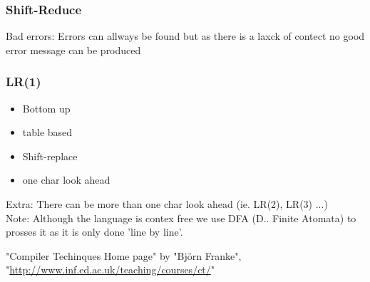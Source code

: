 \documentclass[11pt,twoside,a4paper]{article}
\begin{document}
      \subsubsection{Shift-Reduce}
        Bad errors: Errors can allways be found but as there is a laxck of contect no good error message can be produced
      
      \subsubsection{LR(1)}
        \begin{itemize}
          \item Bottom up
          \item table based
          \item Shift-replace
          \item one char look ahead
        \end{itemize}
        Extra: There can be more than one char look ahead (ie. LR(2), LR(3) ...) \\
        Note: Although the language is contex free we use DFA (D.. Finite Atomata) to prosses it as it is only done 'line by line'.
  
  \clearpage  
  \begin{thebibliography}{9}
      "Compiler Techinques Home page" by "Björn Franke", "\url{http://www.inf.ed.ac.uk/teaching/courses/ct/}"
  \end{thebibliography}
\end{document}
